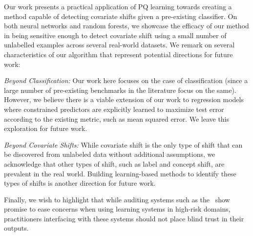 Our work presents a practical application of PQ learning towards creating a method capable of detecting covariate shifts given a pre-existing classifier.
On both neural networks and random forests, we showcase the efficacy of our method in being sensitive enough to detect covariate shift using a small number of unlabelled examples across several real-world datasets.
We remark on several characteristics of our algorithm that represent potential directions for future work:

\emph{Beyond Classification: }Our work here focuses on the case of classification (since a large number of pre-existing benchmarks in the literature focus on the same).
However, we believe there is a viable extension of our work to regression models where constrained predictors are explicitly learned to maximize test error according to the existing metric, such as mean squared error.
We leave this exploration for future work.

\emph{Beyond Covariate Shifts: }While covariate shift is the only type of shift that can be discovered from unlabeled data without additional assumptions, we acknowledge that other types of shift, such as label and concept shift, are prevalent in the real world.
Building learning-based methods to identify these types of shifts is another direction for future work.

Finally, we wish to highlight that while auditing systems such as the \method\ show promise to ease concerns when using learning systems in high-risk domains, practitioners interfacing with these systems should not place blind trust in their outputs.